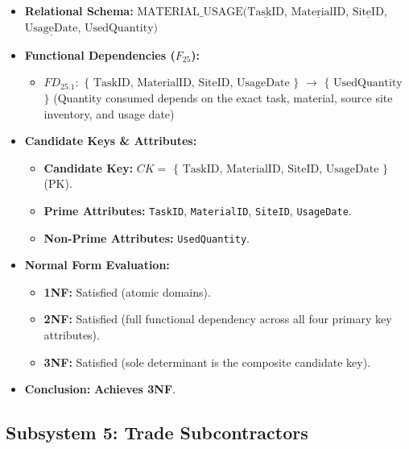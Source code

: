 \documentclass[a4paper,12pt]{report}
\providecommand{\tightlist}{%
  \setlength{\itemsep}{0pt}\setlength{\parskip}{0pt}}
\begin{document}
\begin{itemize}
\item
  \textbf{Relational Schema:} \(\text{MATERIAL\_USAGE}(\underline{\text{TaskID}}\), \(\underline{\text{MaterialID}}\), \(\underline{\text{SiteID}}\), \(\underline{\text{UsageDate}}\), \(\text{UsedQuantity})\)
\item
  \textbf{Functional Dependencies (\(F_{25}\)):}

  \begin{itemize}
  \tightlist
  \item
    \(FD_{25.1}:\) \(\{\) \(\text{TaskID}\), \(\text{MaterialID}\), \(\text{SiteID}\), \(\text{UsageDate}\) \(\}\) \(\rightarrow\) \(\{\) \(\text{UsedQuantity}\) \(\}\) (Quantity consumed depends on the exact task, material, source site inventory, and usage date)
  \end{itemize}
\item
  \textbf{Candidate Keys \& Attributes:}

  \begin{itemize}
  \item
    \textbf{Candidate Key:} \(CK =\) \(\{\) \(\text{TaskID}\), \(\text{MaterialID}\), \(\text{SiteID}\), \(\text{UsageDate}\) \(\}\) (PK).
  \item
    \textbf{Prime Attributes:} \texttt{TaskID}, \texttt{MaterialID}, \texttt{SiteID}, \texttt{UsageDate}.
  \item
    \textbf{Non-Prime Attributes:} \texttt{UsedQuantity}.
  \end{itemize}
\item
  \textbf{Normal Form Evaluation:}

  \begin{itemize}
  \item
    \textbf{1NF:} Satisfied (atomic domains).
  \item
    \textbf{2NF:} Satisfied (full functional dependency across all four primary key attributes).
  \item
    \textbf{3NF:} Satisfied (sole determinant is the composite candidate key).
  \end{itemize}
\item
  \textbf{Conclusion:} \textbf{Achieves 3NF}.
\end{itemize}

\subsection{Subsystem 5: Trade Subcontractors}\label{subsystem-5-trade-subcontractors}
\end{document}
